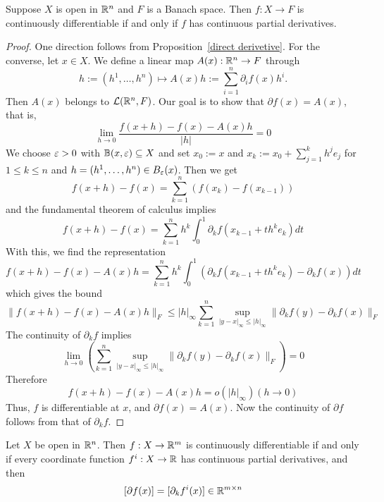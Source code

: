 \begin{theorem}\label{continuously diff iff}
Suppose $X$ is open in $\mathbb{R}^n$ and $F$ is a Banach space. Then $f:X\to F$ is continuously differentiable if and only if $f$ has continuous partial derivatives.
\end{theorem}
\begin{proof}
One direction follows from Proposition~\ref{direct derivetive}. For the converse, let $x\in X$. We define a linear map $A(x):\mathbb{R}^n\to F$ through
\[h:=(h^1,\dots,h^n)\mapsto A(x)h:=
\sum_{i=1}^{n}\partial_if(x)h^i.\]
Then $A(x)$ belongs to $\mathcal{L}(\mathbb{R}^n,F)$. Our goal is to show that $\partial f(x)=A(x)$, that is,
\[\lim_{h\to 0}\dfrac{f(x+h)-f(x)-A(x)h}{|h|}=0\]
We choose $\varepsilon>0$ with $\mathbb{B}(x,\varepsilon)\subseteq X$ and set $x_0:=x$ and $x_k:=x_0+\sum_{j=1}^{k}h^je_j$ for $1\leq k\leq n$ and $h=(h^1,\dots,h^n)\in B_{\varepsilon}(x)$. Then we get
\[f(x+h)-f(x)=\sum_{k=1}^{n}(f(x_k)-f(x_{k-1}))\]
and the fundamental theorem of calculus implies
\[f(x+h)-f(x)=\sum_{k=1}^{n}h^k\int_{0}^{1}\partial_kf(x_{k-1}+th^ke_k)dt\]
With this, we find the representation
\[f(x+h)-f(x)-A(x)h=\sum_{k=1}^{n}h^k\int_{0}^{1}(\partial_kf(x_{k-1}+th^ke_k)-\partial_kf(x))dt\]
which gives the bound
\[\|f(x+h)-f(x)-A(x)h\|_F\leq |h|_{\infty}\sum_{k=1}^{n}\sup_{|y-x|_{\infty}\leq |h|_{\infty}}\|\partial_kf(y)-\partial_kf(x)\|_F\]
The continuity of $\partial_k f$ implies
\[\lim_{h\to 0}\left(\sum_{k=1}^{n}\sup_{|y-x|_{\infty}\leq |h|_{\infty}}\|\partial_kf(y)-\partial_kf(x)\|_F\right)=0\]
Therefore
\[f(x+h)-f(x)-A(x)h=o(|h|_{\infty})(h\to 0)\]
Thus, $f$ is differentiable at $x$, and $\partial f(x)=A(x)$. Now the continuity of $\partial f$ follows from that of $\partial_kf$.
\end{proof}
\begin{corollary}
Let $X$ be open in $\mathbb{R}^n$. Then $f:X\to \mathbb{R}^m$  is continuously differentiable if and only if every coordinate function $f^i:X\to\mathbb{R}$ has continuous partial
derivatives, and then
\[[\partial f(x)]=[\partial_kf^i(x)]\in\mathbb{R}^{m\times n}\]
\end{corollary}
